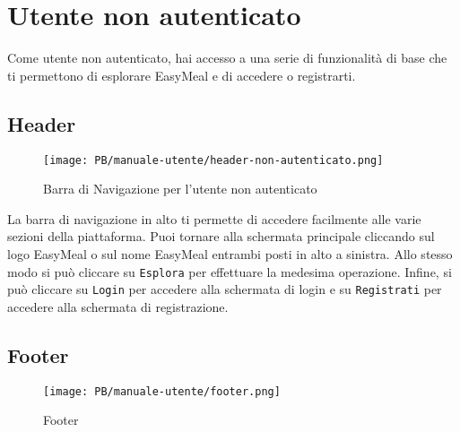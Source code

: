 \section{Utente non autenticato}
Come utente non autenticato, hai accesso a una serie di funzionalità di base che 
ti permettono di esplorare EasyMeal e di accedere o registrarti.

\subsection{Header}

\begin{figure}[htbp]
    \centering
	\texttt{[image: PB/manuale-utente/header-non-autenticato.png]}
    \caption{Barra di Navigazione per l'utente non autenticato}
\end{figure}

La barra di navigazione in alto ti permette di accedere facilmente alle varie 
sezioni della piattaforma. 
Puoi tornare alla schermata principale cliccando sul logo EasyMeal o sul nome 
EasyMeal entrambi posti in alto a sinistra. Allo stesso modo si può cliccare su
\texttt{Esplora} per effettuare la medesima operazione. Infine, si può cliccare
su \texttt{Login} per accedere alla schermata di login e su 
\texttt{Registrati} per accedere alla schermata di registrazione.

\subsection{Footer}

\begin{figure}[htbp]
    \centering
	\texttt{[image: PB/manuale-utente/footer.png]}
    \caption{Footer}
\end{figure}

